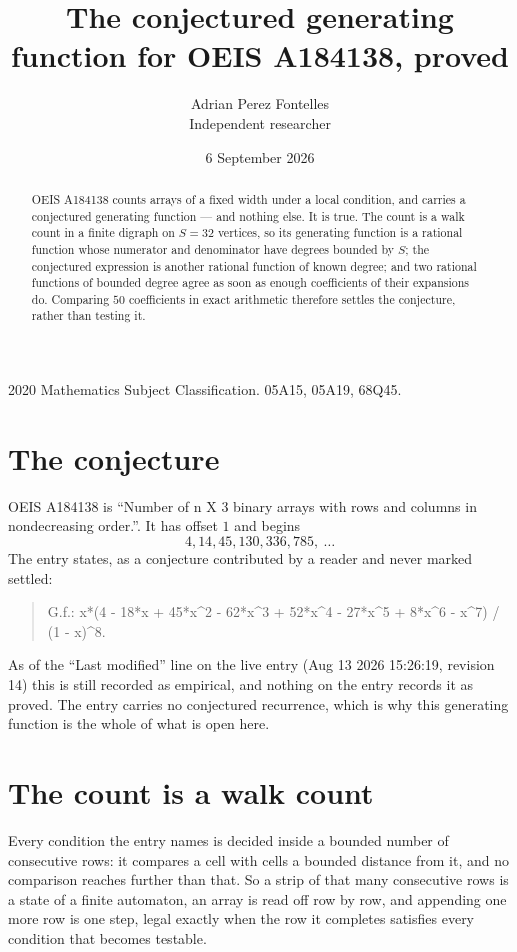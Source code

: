 \documentclass[11pt,a4paper]{article}
\title{The conjectured generating function for OEIS A184138, proved}
\author{Adrian Perez Fontelles\\ \small Independent researcher}
\date{6 September 2026}
\theoremstyle{plain}
\theoremstyle{definition}
\begin{document}
\maketitle

\begin{abstract}
OEIS A184138 counts arrays of a fixed width under a local condition, and carries a conjectured
generating function --- and nothing else. It is true. The count is a walk count in a finite
digraph on $S=32$ vertices, so its generating function is a rational function whose numerator
and denominator have degrees bounded by $S$; the conjectured expression is another rational
function of known degree; and two rational functions of bounded degree agree as soon as enough
coefficients of their expansions do. Comparing $50$ coefficients in exact arithmetic
therefore settles the conjecture, rather than testing it.
\end{abstract}

\noindent\small 2020 Mathematics Subject Classification. 05A15, 05A19, 68Q45.\normalsize

\section{The conjecture}

OEIS A184138 is ``Number of n X 3 binary arrays with rows and columns in nondecreasing order.''. It has offset $1$ and begins
\[
4, 14, 45, 130, 336, 785,\ \dots
\]
The entry states, as a conjecture contributed by a reader and never marked settled:
\begin{quote}
G.f.: x*(4 - 18*x + 45*x\^{}2 - 62*x\^{}3 + 52*x\^{}4 - 27*x\^{}5 + 8*x\^{}6 - x\^{}7) / (1 - x)\^{}8.
\end{quote}
As of the ``Last modified'' line on the live entry (Aug 13 2026 15:26:19, revision 14) this is still
recorded as empirical, and nothing on the entry records it as proved. The entry carries no
conjectured recurrence, which is why this generating function is the whole of what is open
here.

\section{The count is a walk count}

Every condition the entry names is decided inside a bounded number of consecutive rows: it
compares a cell with cells a bounded distance from it, and no comparison reaches further than
that. So a strip of that many consecutive rows is a state of a finite automaton, an array is
read off row by row, and appending one more row is one step, legal exactly when the row it
completes satisfies every condition that becomes testable.
\end{document}
